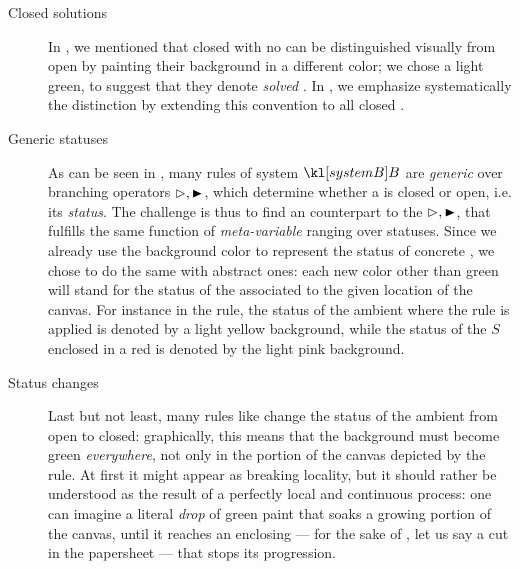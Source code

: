\begin{description}
  \item[Closed solutions] In , we mentioned that closed
 with no   can be distinguished visually from open
 by painting their background in a different color; we chose a light
green, to suggest that they denote \emph{solved} . In
, we emphasize systematically the distinction by extending
this convention to all closed .
  \item[Generic statuses] As can be seen in , many rules of
system $\sysB$ are \emph{generic} over branching operators $\J, \JB$, which
determine whether a  is closed or open, i.e. its \emph{status}. The
challenge is thus to find an  counterpart to the  $\J, \JB$, that
fulfills the same function of \emph{meta-variable} ranging over 
statuses. Since we already use the background color to represent the status of
concrete , we chose to do the same with abstract ones: each new color
other than green will stand for the status of the  associated to the
given location of the canvas. For instance in the 
rule, the status of the ambient  where the rule is applied is denoted by
a light yellow background, while the status of the  $S$ enclosed in a
red  is denoted by the light pink background.
  \item[Status changes] Last but not least, many rules like  change
the status of the ambient  from open to closed: graphically, this means
that the background must become green \emph{everywhere}, not only in the portion
of the canvas depicted by the rule. At first it might appear as breaking
locality, but it should rather be understood as the result of a perfectly local
and continuous process: one can imagine a literal \emph{drop} of green paint
that soaks a growing portion of the canvas, until it reaches an enclosing 
--- for the sake of , let us say a cut in the papersheet --- that
stops its progression.
\end{description}

